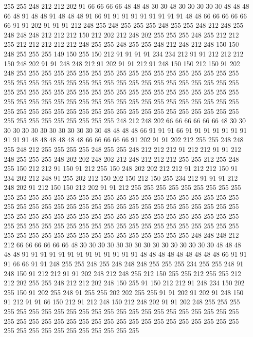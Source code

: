 255 255 248 212 212 202 91 66 66 66 66 48 48 48 30 30 48 30 30 30
30 30 48 48 48 66 48 91 48 48 91 48 48 48 91 66 91 91 91 91
91 91 91 91 91 48 48 66 66 66 66 66 66 91 91 202 91 91 91 212
248 255 248 255 255 255 248 255 255 248 212 248 255 248 248 248 212 212 212 150
212 202 212 248 202 255 255 255 248 255 212 212 255 212 212 212 212 212 248 255
255 248 255 255 248 212 248 212 248 150 150 248 255 255 255 149 150 255 150 212
91 91 91 91 234 234 212 91 91 212 212 212 150 248 202 91 91 248 248 212
91 202 91 91 212 91 248 150 150 212 150 91 202 248 255 255 255 255 255 255
255 255 255 255 255 255 255 255 255 255 255 255 255 255 255 255 255 255 255 255
255 255 255 255 255 255 255 255 255 255 255 255 255 255 255 255 255 255 255 255
255 255 255 255 255 255 255 255 255 255 255 255 255 255 255 255 255 255 255 255
255 255 255 255 255 255 255 255 255 255 255 255 255 255 255 255 255 255 255 255
255 255 255 255 255 255 255 255 255 255 255 255 255 255 255 255 255 248 212 248
202 66 66 66 66 66 66 48 30 30 30 30 30 30 30 30 30 30 30 30
30 48 48 48 48 66 91 91 91 66 91 91 91 91 91 91 91 91 91 91
48 48 48 48 48 48 66 66 66 66 66 91 202 91 91 202 212 255 255 248
248 255 248 212 255 255 255 255 248 255 255 248 212 212 212 91 212 212 91 91
212 248 255 255 255 248 202 202 248 202 212 248 212 212 212 255 255 212 255 248
255 150 212 212 91 150 91 212 255 150 248 202 202 212 212 91 212 212 150 91
234 202 212 248 91 255 202 212 150 202 150 212 150 255 234 212 91 91 91 212
248 202 91 212 150 150 212 202 91 91 212 255 255 255 255 255 255 255 255 255
255 255 255 255 255 255 255 255 255 255 255 255 255 255 255 255 255 255 255 255
255 255 255 255 255 255 255 255 255 255 255 255 255 255 255 255 255 255 255 255
255 255 255 255 255 255 255 255 255 255 255 255 255 255 255 255 255 255 255 255
255 255 255 255 255 255 255 255 255 255 255 255 255 255 255 255 255 255 255 255
255 255 255 255 255 255 255 255 255 255 255 248 248 248 212 212 66 66 66 66
66 66 48 30 30 30 30 30 30 30 30 30 30 30 30 30 30 30 48 48
48 48 48 91 91 91 91 91 91 91 91 91 91 91 91 91 48 48 48 48
48 48 48 48 48 66 91 91 91 66 66 91 91 248 255 255 248 255 248 248
248 255 255 255 234 255 255 248 91 248 150 91 212 212 91 91 202 248 212 248
255 212 150 255 255 212 255 255 212 212 202 255 255 248 212 212 202 248 150 255
91 150 212 212 91 248 234 150 202 255 150 91 202 255 248 91 255 255 202 202
255 255 91 91 202 91 202 91 248 150 91 212 91 91 66 150 212 91 212 248
150 212 248 202 91 91 202 248 255 255 255 255 255 255 255 255 255 255 255 255
255 255 255 255 255 255 255 255 255 255 255 255 255 255 255 255 255 255 255 255
255 255 255 255 255 255 255 255 255 255 255 255 255 255 255 255 255 255 255 255
